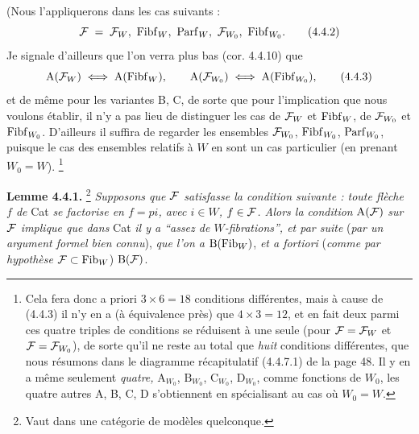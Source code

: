 (Nous l'appliquerons dans les cas suivants : %
\[
\cF \;=\; \cF_W,\ \Fibf_W,\ \Parf_W,\ \cF_{W_0},\ \Fibf_{W_0}.
\tag*{(4.4.2)}
\]
Je signale d'ailleurs que l'on verra plus bas (cor. 4.4.10) que
\[
\mathrm{A}(\cF_W) \iff \mathrm{A}(\Fibf_W), \qquad \mathrm{A}(\cF_{W_0}) \iff \mathrm{A}(\Fibf_{W_0}),
\tag*{(4.4.3)}
\]
et de même pour les variantes B, C, de sorte que pour l'implication que nous voulons établir, il n'y a pas lieu de distinguer les cas de $\mathcal{F}_W$ et $\mathrm{Fibf}_W$, de $\mathcal{F}_{W_0}$ et $\mathrm{Fibf}_{W_0}$. D'ailleurs il suffira de regarder les ensembles $\mathcal{F}_{W_0}$, $\mathrm{Fibf}_{W_0}$, $\mathrm{Parf}_{W_0}$, puisque le cas des ensembles relatifs à $W$ en sont un cas particulier (en prenant $W_0 = W$). \footnote[28]{Cela fera donc a priori $3 \times 6 = 18$ conditions différentes, mais à cause de (4.4.3) il n'y en a (à équivalence près) que $4 \times 3 = 12$, et en fait deux parmi ces quatre triples de conditions se réduisent à une seule (pour $\mathcal{F} = \mathcal{F}_W$ et $\mathcal{F} = \mathcal{F}_{W_0}$), de sorte qu'il ne reste au total que \textit{huit} conditions différentes, que nous résumons dans le diagramme récapitulatif (4.4.7.1) de la page 48. Il y en a même seulement \textit{quatre,} $\mathrm{A}_{W_0}$, $\mathrm{B}_{W_0}$, $\mathrm{C}_{W_0}$, $\mathrm{D}_{W_0}$, comme fonctions de $W_0$, les quatre autres A, B, C, D s'obtiennent en spécialisant au cas où $W_0 = W$.}


\textbf{Lemme 4.4.1.} \footnote[29]{Vaut dans une catégorie de modèles quelconque.} \textit{Supposons que $\mathcal{F}$ satisfasse la condition suivante : toute flèche $f$ de} Cat \textit{se factorise en $f = pi$, avec $i \in W$, $f \in \mathcal{F}$. Alors la condition} $\mathrm{A}(\mathcal{F})$ \textit{sur $\mathcal{F}$ implique que dans} Cat \textit{il y a “assez de $W$-fibrations”, et par suite} (\textit{par un argument formel bien} %
{}
\textit{connu}), \textit{que l'on a} $\mathrm{B}(\mathrm{Fib}_W)$, \textit{et a fortiori} (\textit{comme par hypothèse} $\mathcal{F} \subset \mathrm{Fib}_W$) $\mathrm{B}(\mathcal{F})$.

